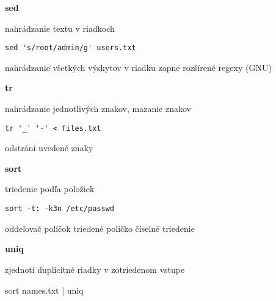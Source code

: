 \documentclass[8pt,landscape]{extarticle}
\newcommand{\Heading}[1]{%
{\begin{center}\bfseries\Large#1\end{center}}%
}%
\newcommand{\Em}[1]{\Ovalbox{\ttfamily #1}}
\newenvironment{karticka}[1]%
{%
\Heading{#1}%
}%
{%
\clearpage
}%
\begin{document}
\begin{karticka}{sed}
\begin{obsah}
nahrádzanie textu v riadkoch
\end{obsah}
\begin{middlecolorbox}
\begin{Verbatim}
sed 's/root/admin/g' users.txt
\end{Verbatim}
\end{middlecolorbox}
\begin{obsah}
\Em{g} nahrádzanie všetkých výskytov v riadku
\Em{-E} zapne rozšírené regexy (GNU)
\end{obsah}

\end{karticka}
\begin{karticka}{tr}
\begin{obsah}
nahrádzanie jednotlivých znakov, mazanie znakov
\end{obsah}
\begin{middlecolorbox}
\begin{Verbatim}
tr '_' '-' < files.txt
\end{Verbatim}
\end{middlecolorbox}
\begin{obsah}
\Em{-d} odstráni uvedené znaky
\end{obsah}

\end{karticka}
\begin{karticka}{sort}
\begin{obsah}
triedenie podľa položiek
\end{obsah}
\begin{middlecolorbox}
\begin{Verbatim}
sort -t: -k3n /etc/passwd
\end{Verbatim}
\end{middlecolorbox}
\begin{obsah}
\Em{-t} oddeľovač políčok
\Em{-k} triedené políčko  \Em{n} číselné triedenie
\end{obsah}

\end{karticka}
\begin{karticka}{uniq}
\begin{obsah}
zjednotí duplicitné riadky v zotriedenom vstupe
\end{obsah}
\vfill
\begin{bottomcolorbox}
sort names.txt | uniq
\end{bottomcolorbox}
\end{karticka}
\end{document}
